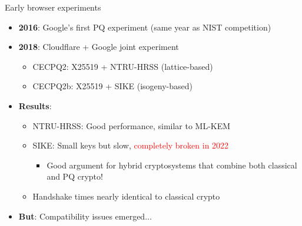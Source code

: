 \documentclass[aspectratio=169, lualatex, handout]{beamer}
\begin{document}
\begin{frame}{Early browser experiments}
	\begin{itemize}
		\item \textbf{2016}: Google's first PQ experiment (same year as NIST competition)
		\item \textbf{2018}: Cloudflare + Google joint experiment
		      \begin{itemize}
			      \item CECPQ2: X25519 + NTRU-HRSS (lattice-based)
			      \item CECPQ2b: X25519 + SIKE (isogeny-based)
		      \end{itemize}
		\item \textbf{Results}:
		      \begin{itemize}
			      \item NTRU-HRSS: Good performance, similar to ML-KEM
			      \item SIKE: Small keys but slow, \textcolor{red}{completely broken in 2022}
			            \begin{itemize}
				            \item Good argument for hybrid cryptosystems that combine both classical and PQ crypto!
			            \end{itemize}
			      \item Handshake times nearly identical to classical crypto
		      \end{itemize}
		\item \textbf{But}: Compatibility issues emerged...
	\end{itemize}
\end{frame}
\end{document}

